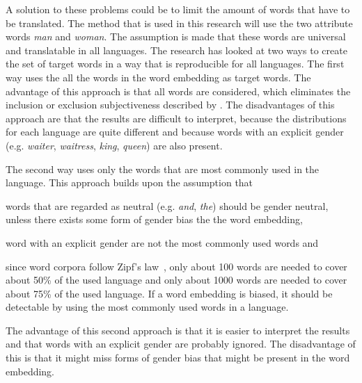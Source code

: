 A solution to these problems could be to limit the amount of words that have to be
translated. The method that is used in this research will use the two attribute words 
\textit{man} and \textit{woman}. The assumption is made that these words are universal and translatable in all languages. The research has looked at two ways to create the set of
target words in a way that is reproducible for all languages. The first way uses the
all the words in the word embedding as target words. The advantage of this approach is 
that all words are considered, which eliminates the inclusion or exclusion subjectiveness
described by \textcite{nissim_fair_is_better_2020}. The disadvantages of this approach
are that the results are difficult to interpret, because the distributions for each
language are quite different and because words with an explicit 
gender (e.g. \textit{waiter}, \textit{waitress}, \textit{king}, \textit{queen}) are also 
present.

The second way uses only the words that are most commonly used in the language. This
approach builds upon the assumption that 
\begin{seriate}
\item words that are regarded as neutral (e.g. \textit{and}, \textit{the}) should be
    gender neutral, unless there exists some form of gender bias the the word embedding,
\item word with an explicit gender are not the most commonly used words and
\item since word corpora follow Zipf's law~\parencite{li1992random}, only about 100 words are needed to cover about 50\% of the used language and only about 1000 words are needed to cover about 75\% of the used language. If a word embedding is biased, it should be detectable by using the most commonly used words in a language.
\end{seriate}
The advantage of this second approach is that it is easier to interpret the results and
that words with an explicit gender are probably ignored. The disadvantage of this is that
it might miss forms of gender bias that might be present in the word embedding.
